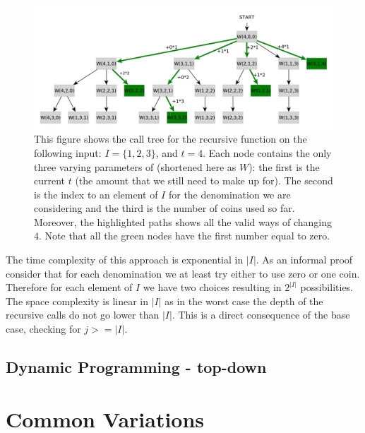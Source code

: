 \begin{figure}
	\centering
	\label{fig:coin_change:recursiontree}
	\includegraphics[width=\textwidth]{sources/coin_change/images/recursiontree}
	\captionsetup{singlelinecheck=off}
	\caption{This figure shows the call tree for the recursive function  on the following input:  $I = \{1,2,3\}$, and $t=4$. Each node contains the only three varying parameters of  (shortened here as $W$): the first is the current $t$ (the amount that we still need to make up for). The second   is the index to an element of $I$ for the denomination we are considering and the third is the number of coins used so far.
	Moreover, the highlighted paths shows all the valid ways of changing $4$. Note that all the green nodes have the first number equal to zero.}
\end{figure}



The time complexity of this approach is exponential in $|I|$. As an informal proof consider that for each denomination we at least try either to use zero or one coin. 
Therefore for each element of $I$ we have two choices resulting in $2^{|I|}$ possibilities. 
The space complexity is linear in $|I|$ as in the worst case the depth of the recursive calls do not go lower than $|I|$. This is a direct consequence of the base case, checking for $j >= |I|$.

\subsection{Dynamic Programming - top-down}




\section{Common Variations}
